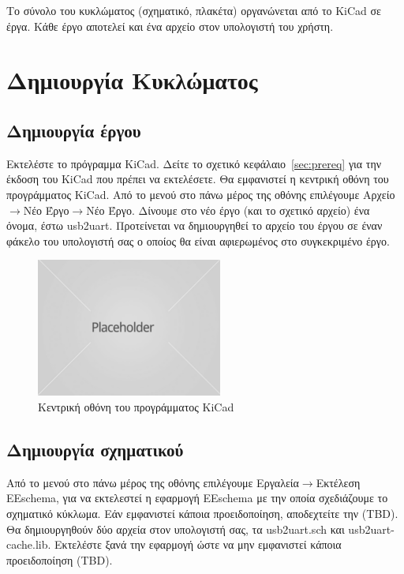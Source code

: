 \documentclass[a4paper]{article}
\begin{document}
Το σύνολο του κυκλώματος (σχηματικό, πλακέτα) οργανώνεται από το KiCad σε έργα. Κάθε έργο αποτελεί και ένα αρχείο στον υπολογιστή του χρήστη. 

\section{Δημιουργία Κυκλώματος}

\subsection{Δημιουργία έργου}
Εκτελέστε το πρόγραμμα KiCad. Δείτε το σχετικό κεφάλαιο~\ref{sec:prereq} για την έκδοση του KiCad που πρέπει να εκτελέσετε. Θα εμφανιστεί η κεντρική οθόνη του προγράμματος KiCad. Από το μενού στο πάνω μέρος της οθόνης επιλέγουμε Αρχείο$\rightarrow$Νέο Έργο$\rightarrow$Νέο Έργο. Δίνουμε στο νέο έργο (και το σχετικό αρχείο) ένα όνομα, έστω usb2uart. Προτείνεται να δημιουργηθεί το αρχείο του έργου σε έναν φάκελο του υπολογιστή σας ο οποίος θα είναι αφιερωμένος στο συγκεκριμένο έργο.

\begin{figure}
  \begin{center}
    \includegraphics{img/kicad-main.png}
    \caption{Κεντρική οθόνη του προγράμματος KiCad}
    \label{fig:kicad-main}
  \end{center}
\end{figure}

\subsection{Δημιουργία σχηματικού}
Από το μενού στο πάνω μέρος της οθόνης επιλέγουμε Εργαλεία$\rightarrow$Εκτέλεση EEschema, για να εκτελεστεί η εφαρμογή EEschema με την οποία σχεδιάζουμε το σχηματικό κύκλωμα. Εάν εμφανιστεί κάποια προειδοποίηση, αποδεχτείτε την (TBD). Θα δημιουργηθούν δύο αρχεία στον υπολογιστή σας, τα usb2uart.sch και usb2uart-cache.lib. Εκτελέστε ξανά την εφαρμογή ώστε να μην εμφανιστεί κάποια προειδοποίηση (TBD).
\end{document}
